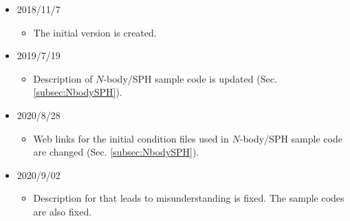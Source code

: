 \begin{itemize}
\item 2018/11/7
  \begin{itemize}
  \item The initial version is created.
  \end{itemize}
\item 2019/7/19
  \begin{itemize}
  \item Description of $N$-body/SPH sample code is updated (Sec. \ref{subsec:NbodySPH}).
  \end{itemize}
\item 2020/8/28
  \begin{itemize}
  \item Web links for the initial condition files used in $N$-body/SPH sample code are changed (Sec. \ref{subsec:NbodySPH}).
  \end{itemize}
\item 2020/9/02
  \begin{itemize}
  \item Description for \initTree that leads to misunderstanding is fixed. The sample codes are also fixed.
  \end{itemize}
\end{itemize}
